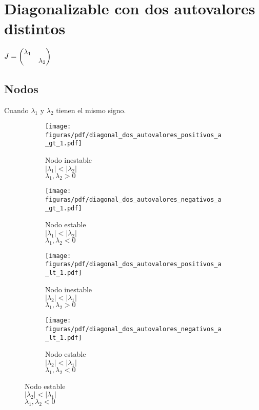 \documentclass[../ecuaciones_diferenciales.tex]{subfiles}
\begin{document}
\section{Diagonalizable con dos autovalores distintos}
\(J = \begin{pmatrix} \lambda_1 & \\ & \lambda_2 \end{pmatrix}\)
\subsection{Nodos}
Cuando \(\lambda_1\) y \(\lambda_2\) tienen el mismo signo.
\begin{figure}[ht]
  \centering
  \begin{subfigure}{0.25\textwidth}
    \centering
    \texttt{[image: figuras/pdf/diagonal\_dos\_autovalores\_positivos\_a\_gt\_1.pdf]}
    \caption*{Nodo inestable \\ \(|\lambda_1| < |\lambda_2|\) \\ \(\lambda_1, \lambda_2 > 0\)}
  \end{subfigure}%
  \begin{subfigure}{0.25\textwidth}
    \centering
    \texttt{[image: figuras/pdf/diagonal\_dos\_autovalores\_negativos\_a\_gt\_1.pdf]}
    \caption*{Nodo estable \\ \(|\lambda_1| < |\lambda_2|\) \\ \(\lambda_1, \lambda_2 < 0\)}
  \end{subfigure}%
  \begin{subfigure}{0.25\textwidth}
    \centering
    \texttt{[image: figuras/pdf/diagonal\_dos\_autovalores\_positivos\_a\_lt\_1.pdf]}
    \caption*{Nodo inestable \\ \(|\lambda_2| < |\lambda_1|\) \\ \(\lambda_1, \lambda_2 > 0\)}
  \end{subfigure}%
  \begin{subfigure}{0.25\textwidth}
    \centering
    \texttt{[image: figuras/pdf/diagonal\_dos\_autovalores\_negativos\_a\_lt\_1.pdf]}
    \caption*{Nodo estable \\ \(|\lambda_2| < |\lambda_1|\) \\ \(\lambda_1, \lambda_2 < 0\)}
  \end{subfigure}
\end{figure}
\end{document}
